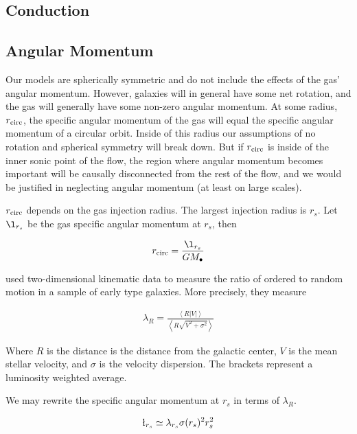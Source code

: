 \documentclass[usenatbib,fleqn]{mn2e}
\newcommand{\rs}{r_s}
\newcommand{\rcirc}{r_{\rm circ}}
\newcommand{\lrs}{\l_{\rs}}
\newcommand{\lambdars}{\lambda_{\rs}}
\newcommand{\Mbh}[1][]{M_{\bullet#1}}
\begin{document}
\subsection{Conduction}
\label{sec:conduction}{

  \subsection{Angular Momentum}
  \label{sec:ang}
  Our models are spherically symmetric and do not include the effects of
  the gas' angular momentum. However, galaxies will in general have some
  net rotation, and the gas will generally have some non-zero angular
  momentum. At some radius, $\rcirc$, the specific angular momentum of
  the gas will equal the specific angular momentum of a circular
  orbit. Inside of this radius our assumptions of no rotation and
  spherical symmetry will break down. But if $\rcirc$ is inside of the
  inner sonic point of the flow, the region where angular momentum
  becomes important will be causally disconnected from the rest of the
  flow, and we would be justified in neglecting angular momentum (at
  least on large scales).

  $\rcirc$ depends on the gas injection radius. The largest
  injection radius is $\rs$. Let $\lrs$ be the gas specific angular
  momentum at $\rs$, then 

  \begin{align}
    \rcirc=\frac{\lrs}{G \Mbh}
  \end{align}

  \citet{EmsellemCappellari+:2007a} used two-dimensional kinematic
  data to measure the ratio of ordered to random motion in a sample of
  early type galaxies. More precisely, they measure

  \begin{align}
    \lambda_R=\frac{\left<R|V|\right>}{\left<R\sqrt{V^2+\sigma^2}\right>}
  \end{align}

  Where $R$ is the distance is the distance from the galactic center, $V$ is
  the mean stellar velocity, and $\sigma$ is the velocity
  dispersion. The brackets represent a luminosity weighted average.

  We may rewrite the specific angular momentum at $\rs$ in terms of $\lambda_R$.

  \begin{align}
    \lrs\simeq\lambdars \sigma(\rs)^2 \rs^2
  \end{align}

}
\end{document}
